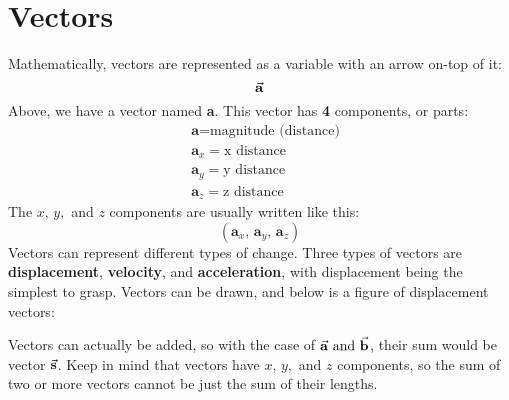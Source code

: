 \documentclass{article}
\begin{document}
\section{Vectors}
Mathematically, vectors are represented as a variable
with an arrow on-top of it:
\[\va{a}\]
Above, we have a vector named \textbf{a}. This vector has \textbf{4} components, or parts:
\begin{align*}
    & \textbf{a} = \text{magnitude (distance)} \\
    & \textbf{a}_x = \text{x distance} \\
    & \textbf{a}_y = \text{y distance} \\
    & \textbf{a}_z = \text{z distance}
\end{align*}
The $x,\,y,$ and $z$ components are usually written like this:
\[ (\textbf{a}_x, \, \textbf{a}_y, \, \textbf{a}_z) \]
Vectors can represent different types of change. Three types of vectors are \textbf{displacement}, \textbf{velocity}, and \textbf{acceleration},
with displacement being the simplest to grasp. 
Vectors can be drawn, and below is a figure of displacement vectors:
\begin{figure}[H]
    \begin{center}
    \end{center}
\end{figure}
\noindent Vectors can actually be added, so with the case of $\va{a} \text{   and   } \va{b}$,
their sum would be vector $\va{s}$. Keep in mind that vectors have $x,\,y,$ and $z$ components, so
the sum of two or more vectors cannot be just the sum of their lengths.
\end{document}
